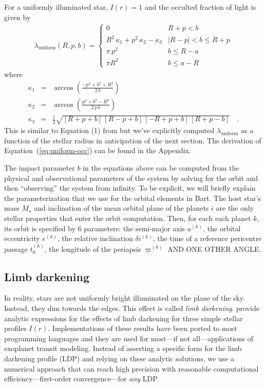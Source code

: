 \documentclass[12pt,preprint]{aastex}
\newcommand{\project}[1]{{\sffamily #1}}
\newcommand{\bart}{\project{Bart}}
\newcommand{\Eq}[1]{Equation~(\ref{eq:#1})}
\newcommand{\eq}[1]{\Eq{#1}}
\newcommand{\eqlabel}[1]{\label{eq:#1}}
\begin{document}
For a uniformly illuminated star, $I(r) = 1$ and the occulted fraction of
light is given by
\begin{eqnarray}\eqlabel{uniform-occ}
    \lambda_\mathrm{uniform} (R, p, b) = \left \{ \begin{array}{ll}
            0 & R + p < b \\
            R^2 \, \kappa_1 + p^2 \, \kappa_2 - \kappa_3
                & |R - p| < b \leq R + p \\
            \pi \, p^2 & b \leq R - a \\
            \pi R^2 & b \leq a - R
        \end{array} \right.
\end{eqnarray}
where
\begin{eqnarray}
    \kappa_1 & = & \arccos \left ( \frac{-p^2 + b^2 + R^2}{2 \, b} \right ) \\
    \kappa_2 & = & \arccos \left ( \frac{p^2 + b^2 - R^2}{2\, p \, b}
                           \right ) \\
    \kappa_3 & = & \frac{1}{2} \sqrt{[R + p + b] \, [R - p + b]
                        \, [-R + p + b] \, [R + p - b]} \quad.
\end{eqnarray}
This is similar to Equation (1) from \citet{mandel} but we've explicitly
computed $\lambda_\mathrm{uniform}$ as a function of the stellar radius in
anticipation of the next section.
The derivation of \eq{uniform-occ} can be found in the Appendix.

The impact parameter $b$ in the equations above can be computed from the
physical and observational parameters of the system by solving for the orbit
and then ``observing'' the system from infinity.
To be explicit, we will briefly explain the parameterization that we use for
the orbital elements in \bart.
The host star's mass $M_\star$ and inclination of the mean orbital
plane of the planets $i$ are the only stellar properties that enter
the orbit computation.
Then, for each each planet $k$, its orbit is
specified by 6 parameters: the semi-major axis $a^{(k)}$, the orbital
eccentricity $e^{(k)}$, the relative inclination $\delta i^{(k)}$, the time of
a reference pericentre passage $t_0^{(k)}$, the longitude of the periapsis
$\varpi^{(k)}$ AND ONE OTHER ANGLE.


\subsection{Limb darkening}

In reality, stars are not uniformly bright illuminated on the plane of the
sky.
Instead, they dim towards the edges.
This effect is called \emph{limb darkening}.
\citet{mandel} provide analytic expressions for the
effects of limb darkening for three simple stellar profiles $I(r)$.
Implementations of these results have been ported to most programming
languages and they are used for most---if not all---applications of exoplanet
transit modeling.
Instead of asserting a specific form for the limb darkening
profile (LDP) and relying on these analytic solutions, we use a numerical
approach that can reach high precision with reasonable computational
efficiency---first-order convergence---for \emph{any} LDP.
\end{document}
